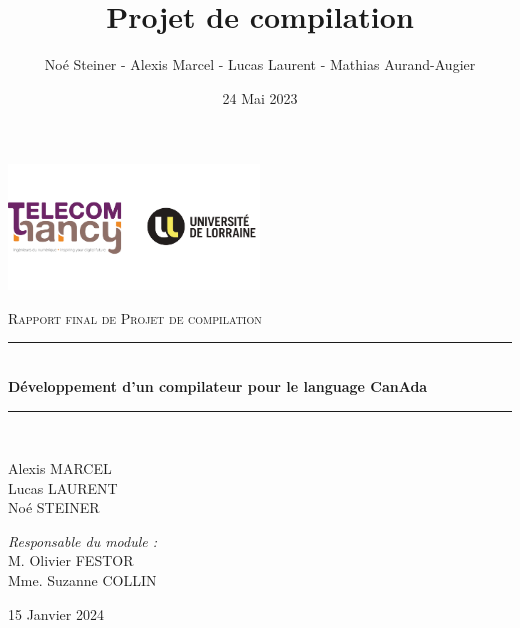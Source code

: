 \documentclass[french,a4paper]{article}
\title{Projet de compilation}
\author{Noé Steiner - Alexis Marcel - Lucas Laurent - Mathias Aurand-Augier}
\date{24 Mai 2023}
\newcommand{\HRule}{\rule{\linewidth}{0.5mm}}
\begin{document}

    \begin{titlepage}
        \begin{center}

            \includegraphics[width=0.5\textwidth]{tele_univ}

            \textsc{\Large Rapport final de Projet de compilation}\\[1.5cm]

            \HRule \\[0.4cm]
            { \huge \bfseries Développement d'un compilateur pour le language CanAda\\[0.4cm] }

            \HRule \\[2cm]

            \begin{minipage}{0.4\textwidth}
                \begin{flushleft} \large
                Alexis MARCEL\\
                Lucas LAURENT\\
                Noé STEINER\\
                \end{flushleft}
            \end{minipage}
            \begin{minipage}{0.4\textwidth}
                \begin{flushright} \large
                \emph{Responsable du module :}\\
                M. Olivier FESTOR\\
                Mme. Suzanne COLLIN\\
                \end{flushright}
            \end{minipage}

            \vfill

            {\large 15 Janvier 2024}

        \end{center}
    \end{titlepage}
    \newpage
    \tableofcontents
    \newpage
\end{document}
